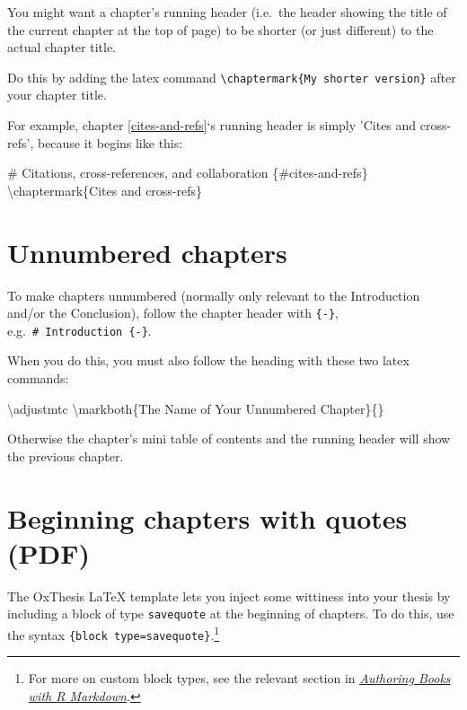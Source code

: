 \documentclass[a4paper, nobind]{templates/ociamthesis}
\newenvironment{Shaded}{\begin{snugshade}}{\end{snugshade}}
\newcommand{\FunctionTok}[1]{\textcolor[rgb]{0.00,0.00,0.00}{#1}}
\newcommand{\NormalTok}[1]{#1}
\renewenvironment{Shaded}
{
  \vspace{10pt}%
  \begin{snugshade}%
}{%
  \end{snugshade}%
  \vspace{8pt}%
}
\begin{document}
You might want a chapter's running header (i.e.~the header showing the title of the current chapter at the top of page) to be shorter (or just different) to the actual chapter title.

Do this by adding the latex command \texttt{\textbackslash{}chaptermark\{My\ shorter\ version\}} after your chapter title.

For example, chapter \ref{cites-and-refs}`s running header is simply 'Cites and cross-refs', because it begins like this:

\begin{Shaded}
\begin{Highlighting}[]
\FunctionTok{\# Citations, cross{-}references, and collaboration \{\#cites{-}and{-}refs\} }
\NormalTok{\textbackslash{}chaptermark\{Cites and cross{-}refs\}}
\end{Highlighting}
\end{Shaded}

\hypertarget{unnumbered-chapters}{%
\section{Unnumbered chapters}\label{unnumbered-chapters}}

To make chapters unnumbered (normally only relevant to the Introduction and/or the Conclusion), follow the chapter header with \texttt{\{-\}}, e.g.~\texttt{\#\ Introduction\ \{-\}}.

When you do this, you must also follow the heading with these two latex commands:

\begin{Shaded}
\begin{Highlighting}[]
\FunctionTok{\textbackslash{}adjustmtc}
\FunctionTok{\textbackslash{}markboth}\NormalTok{\{The Name of Your Unnumbered Chapter\}\{\}}
\end{Highlighting}
\end{Shaded}

Otherwise the chapter's mini table of contents and the running header will show the previous chapter.

\hypertarget{beginning-chapters-with-quotes-pdf}{%
\section{Beginning chapters with quotes (PDF)}\label{beginning-chapters-with-quotes-pdf}}

The OxThesis LaTeX template lets you inject some wittiness into your thesis by including a block of type \texttt{savequote} at the beginning of chapters.
To do this, use the syntax \texttt{\textasciigrave{}\textasciigrave{}\textasciigrave{}\{block\ type=\textquotesingle{}savequote\textquotesingle{}\}}.\footnote{For more on custom block types, see the relevant section in \href{https://bookdown.org/yihui/bookdown/custom-blocks.html}{\emph{Authoring Books with R Markdown}}.}
\end{document}
